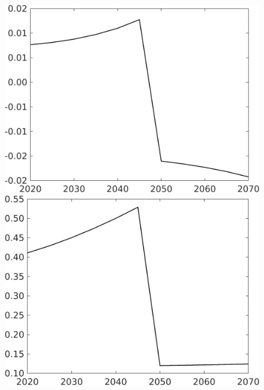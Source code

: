 \begin{figure}[h!!!]
\begin{minipage}[]{0.32\textwidth}
	\end{minipage}
	\begin{minipage}[]{0.32\textwidth}
		\includegraphics[width=1\textwidth]{../../codding_model/own_basedOnFried/optimalPol_010922_revision/figures/all_13Sept22_Tplus30/SWF_OPT_COMPtaulPer_regime4_spillover0_knspil1_noskill1_sep0_xgrowth0_PV1_etaa0.79.png}
	\end{minipage}
	\begin{minipage}[]{0.32\textwidth}
		\includegraphics[width=1\textwidth]{../../codding_model/own_basedOnFried/optimalPol_010922_revision/figures/all_13Sept22_Tplus30/hh_OPT_COMPtaulPer_regime4_spillover0_knspil1_noskill1_sep0_xgrowth0_PV1_etaa0.79.png}

\end{minipage}
\end{figure}
